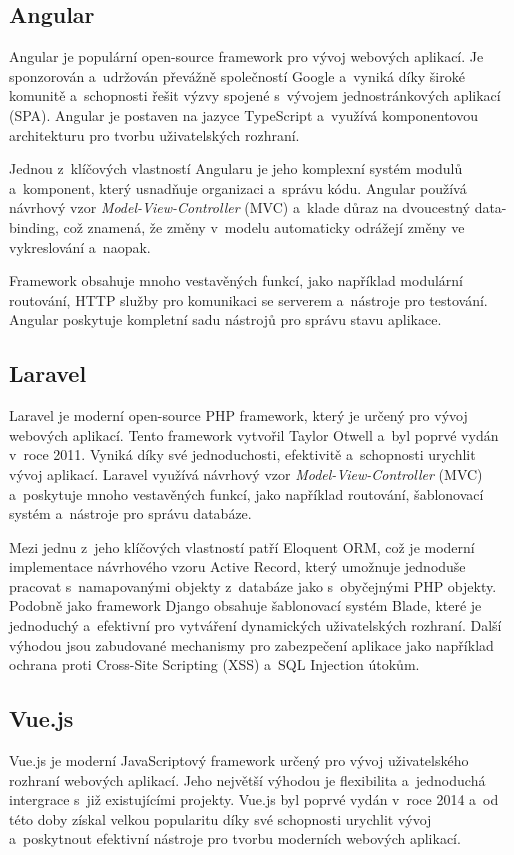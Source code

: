 \subsection{Angular}
\label{subsec:dev-framework-angular}
Angular je populární open-source framework pro vývoj webových aplikací. Je sponzorován a~udržován převážně společností Google a~vyniká díky široké komunitě a~schopnosti řešit výzvy spojené s~vývojem jednostránkových aplikací (SPA). Angular je postaven na jazyce TypeScript a~využívá komponentovou architekturu pro tvorbu uživatelských rozhraní.

Jednou z~klíčových vlastností Angularu je jeho komplexní systém modulů a~komponent, který usnadňuje organizaci a~správu kódu. Angular používá návrhový vzor \textit{Model-View-Controller} (MVC) a~klade důraz na dvoucestný data-binding, což znamená, že změny v~modelu automaticky odrážejí změny ve vykreslování a~naopak.

Framework obsahuje mnoho vestavěných funkcí, jako například modulární routování, HTTP služby pro komunikaci se serverem a~nástroje pro testování. Angular poskytuje kompletní sadu nástrojů pro správu stavu aplikace. \cite{about_angular}

\subsection{Laravel}
\label{subsec:dev-framework-laravel}
Laravel je moderní open-source PHP framework, který je určený pro vývoj webových aplikací. Tento framework vytvořil Taylor Otwell a~byl poprvé vydán v~roce 2011. Vyniká díky své jednoduchosti, efektivitě a~schopnosti urychlit vývoj aplikací. Laravel využívá návrhový vzor \textit{Model-View-Controller} (MVC) a~poskytuje mnoho vestavěných funkcí, jako například routování, šablonovací systém a~nástroje pro správu databáze.

Mezi jednu z~jeho klíčových vlastností patří Eloquent ORM, což je moderní implementace návrhového vzoru Active Record, který umožnuje jednoduše pracovat s~namapovanými objekty z~databáze jako s~obyčejnými PHP objekty. Podobně jako framework Django obsahuje šablonovací systém Blade, které je jednoduchý a~efektivní pro vytváření dynamických uživatelských rozhraní. Další výhodou jsou zabudované mechanismy pro zabezpečení aplikace jako například ochrana proti Cross-Site Scripting (XSS) a~SQL Injection útokům. \cite{about_laravel}

\subsection{Vue.js}
\label{subsec:dev-framework-vuejs}
Vue.js je moderní JavaScriptový framework určený pro vývoj uživatelského rozhraní webových aplikací. Jeho největší výhodou je flexibilita a~jednoduchá intergrace s~již existujícími projekty. Vue.js byl poprvé vydán v~roce 2014 a~od této doby získal velkou popularitu díky své schopnosti urychlit vývoj a~poskytnout efektivní nástroje pro tvorbu moderních webových aplikací.

